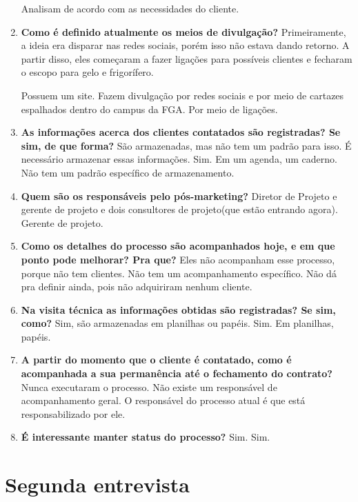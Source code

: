 \begin{enumerate}
		\subitem Analisam de acordo com as necessidades do cliente.
	\item \textbf{Como é definido atualmente os meios de divulgação?}
		\subitem Primeiramente, a ideia era disparar nas redes sociais, porém isso não estava dando retorno. A partir disso, eles começaram a fazer ligações para possíveis clientes e fecharam o escopo para gelo e frigorífero. 

		\subitem Possuem um site. Fazem divulgação por redes sociais e por meio de cartazes espalhados dentro do campus da FGA. Por meio de ligações.
		
	\item \textbf{As informações acerca dos clientes contatados são registradas? Se sim, de que forma?}
		\subitem São armazenadas, mas não tem um padrão para isso. É necessário armazenar essas informações.
		\subitem Sim. Em um agenda, um caderno. Não tem um padrão específico de armazenamento.
	\item \textbf{Quem são os responsáveis pelo pós-marketing?}
		\subitem Diretor de Projeto e gerente de projeto e dois consultores de projeto(que estão entrando agora).
		\subitem Gerente de projeto.
	\item \textbf{Como os detalhes do processo são acompanhados hoje, e em que ponto pode melhorar? Pra que?}
		\subitem Eles não acompanham esse processo, porque não tem clientes.
		\subitem Não tem um acompanhamento específico. Não dá pra definir ainda, pois não adquiriram nenhum cliente.
	\item \textbf{Na visita técnica as informações obtidas são registradas? Se sim, como?}
		\subitem Sim, são armazenadas em planilhas ou papéis.
		\subitem Sim. Em planilhas, papéis.
	\item \textbf{A partir do momento que o cliente é contatado, como é acompanhada a sua permanência até o fechamento do contrato?}
		\subitem Nunca executaram o processo.
		\subitem Não existe um responsável de acompanhamento geral. O responsável do processo atual é que está responsabilizado por ele.
	\item \textbf{É interessante manter status do processo?}
		\subitem Sim.
		\subitem Sim.
\end{enumerate}

\section{Segunda entrevista}

